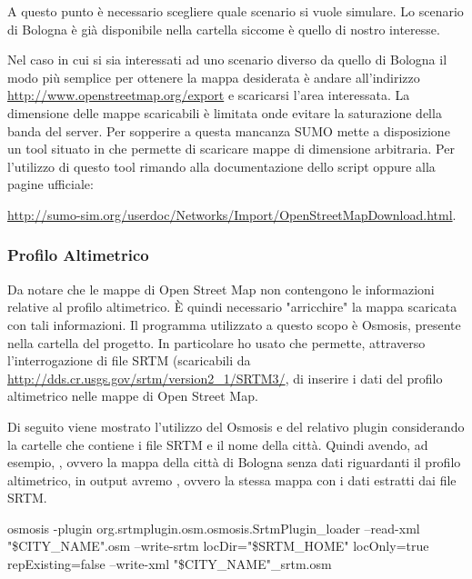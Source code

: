 A questo punto è necessario scegliere quale scenario si vuole simulare. Lo scenario di Bologna è già disponibile nella cartella  siccome è quello di nostro interesse.

Nel caso in cui si sia interessati ad uno scenario diverso da quello di Bologna il modo più semplice per ottenere la mappa desiderata è andare all'indirizzo \url{http://www.openstreetmap.org/export} e scaricarsi l'area interessata. La dimensione delle mappe scaricabili è limitata onde evitare la saturazione della banda del server. Per sopperire a questa mancanza SUMO mette a disposizione un tool situato in  che permette di scaricare mappe di dimensione arbitraria. Per l'utilizzo di questo tool rimando alla documentazione dello script oppure alla pagine ufficiale:

\url{http://sumo-sim.org/userdoc/Networks/Import/OpenStreetMapDownload.html}.

\subsubsection{Profilo Altimetrico}\label{profilo-altimetrico}

Da notare che le mappe di Open Street Map non contengono le informazioni relative al profilo altimetrico. È quindi necessario "arricchire" la mappa scaricata con tali informazioni. Il programma utilizzato a questo scopo è Osmosis, presente nella cartella  del progetto. In particolare ho usato  che permette, attraverso l'interrogazione di file SRTM (scaricabili da \url{http://dds.cr.usgs.gov/srtm/version2_1/SRTM3/}, di inserire i dati del profilo altimetrico nelle mappe di Open Street Map. 

Di seguito viene mostrato l'utilizzo del Osmosis e del relativo plugin considerando  la cartelle che contiene i file SRTM e  il nome della città. Quindi avendo, ad esempio, , ovvero la mappa della città di Bologna senza dati riguardanti il profilo altimetrico, in output avremo , ovvero la stessa mappa con i dati estratti dai file SRTM.

\begin{bash}
osmosis -plugin org.srtmplugin.osm.osmosis.SrtmPlugin_loader --read-xml "\$CITY_NAME".osm --write-srtm locDir="\$SRTM_HOME" locOnly=true repExisting=false --write-xml "\$CITY_NAME"_srtm.osm
\end{bash}

